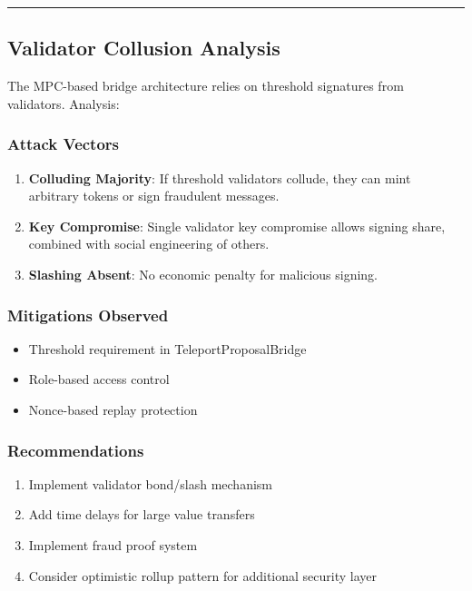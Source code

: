 \documentclass[
]{article}
\providecommand{\tightlist}{%
  \setlength{\itemsep}{0pt}\setlength{\parskip}{0pt}}
\begin{document}
\begin{center}\rule{0.5\linewidth}{0.5pt}\end{center}

\subsection{Validator Collusion
Analysis}\label{validator-collusion-analysis}

The MPC-based bridge architecture relies on threshold signatures from
validators. Analysis:

\subsubsection{Attack Vectors}\label{attack-vectors}

\begin{enumerate}
\def\labelenumi{\arabic{enumi}.}
\item
  \textbf{Colluding Majority}: If threshold validators collude, they can
  mint arbitrary tokens or sign fraudulent messages.
\item
  \textbf{Key Compromise}: Single validator key compromise allows
  signing share, combined with social engineering of others.
\item
  \textbf{Slashing Absent}: No economic penalty for malicious signing.
\end{enumerate}

\subsubsection{Mitigations Observed}\label{mitigations-observed}

\begin{itemize}
\tightlist
\item
  Threshold requirement in TeleportProposalBridge
\item
  Role-based access control
\item
  Nonce-based replay protection
\end{itemize}

\subsubsection{Recommendations}\label{recommendations}

\begin{enumerate}
\def\labelenumi{\arabic{enumi}.}
\tightlist
\item
  Implement validator bond/slash mechanism
\item
  Add time delays for large value transfers
\item
  Implement fraud proof system
\item
  Consider optimistic rollup pattern for additional security layer
\end{enumerate}
\end{document}

